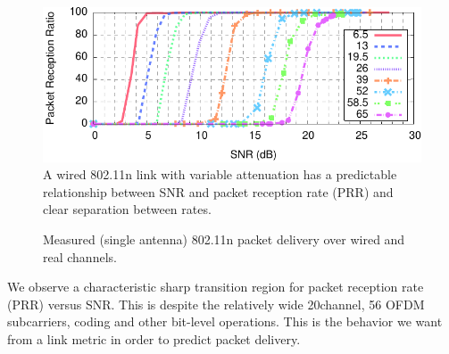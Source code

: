 \begin{figure}[t]
	\centering
	\includegraphics[width=\textwidth]{figures/snr_prr_atten.pdf}
	\caption{\label{fig:snr_prr_attenuator}A wired 802.11n link with variable attenuation has a predictable relationship between SNR and packet reception rate (PRR) and clear separation between rates.}
\end{figure}
\begin{figure}

	\caption[Packet delivery over wired and real 802.11 channels]{\label{fig:rssi_predictions}Measured (single antenna) 802.11n packet delivery over wired and real channels.}%
\end{figure}


We observe a characteristic sharp transition region for packet reception rate (PRR) versus SNR\@. This is despite the relatively wide 20\MHz channel, 56 OFDM subcarriers, coding and other bit-level operations. This is the behavior we want from a link metric in order to predict packet delivery.

